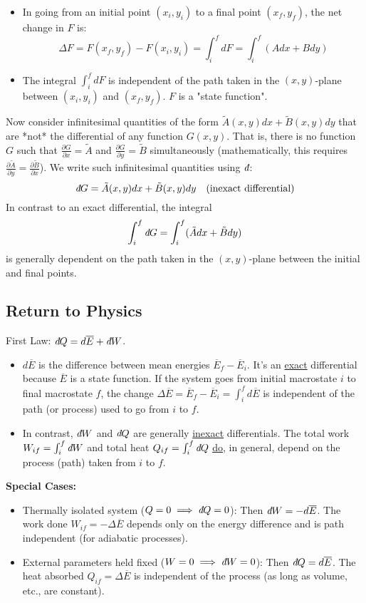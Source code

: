 \documentclass[11pt]{article}
\newcommand{\avg}[1]{\overline{#1}}
\newcommand{\pderiv}[2]{\frac{\partial #1}{\partial #2}}
\newcommand{\ethbar}{\text{\it{đ}}} %
\begin{document}
\begin{itemize}
    \item In going from an initial point $(x_i, y_i)$ to a final point $(x_f, y_f)$, the net change in $F$ is:
    \[ \Delta F = F(x_f, y_f) - F(x_i, y_i) = \int_i^f dF = \int_i^f (A dx + B dy) \]
    \item The integral $\int_i^f dF$ is independent of the path taken in the $(x,y)$-plane between $(x_i, y_i)$ and $(x_f, y_f)$. $F$ is a "state function".
\end{itemize}

Now consider infinitesimal quantities of the form $\tilde{A}(x,y)dx + \tilde{B}(x,y)dy$ that are *not* the differential of any function $G(x,y)$. That is, there is no function $G$ such that $\pderiv{G}{x} = \tilde{A}$ and $\pderiv{G}{y} = \tilde{B}$ simultaneously (mathematically, this requires $\pderiv{\tilde{A}}{y} = \pderiv{\tilde{B}}{x}$).
We write such infinitesimal quantities using $\ethbar$:
\[ \ethbar G = \tilde{A}(x,y)dx + \tilde{B}(x,y)dy \quad (\text{inexact differential}) \]
In contrast to an exact differential, the integral
\[ \int_i^f \ethbar G = \int_i^f (\tilde{A}dx + \tilde{B}dy) \]
is generally dependent on the path taken in the $(x,y)$-plane between the initial and final points.

\subsection*{Return to Physics}

First Law: $\ethbar Q = d\avg{E} + \ethbar W$.
\begin{itemize}
    \item $d\avg{E}$ is the difference between mean energies $\avg{E}_f - \avg{E}_i$. It's an \underline{exact} differential because $\avg{E}$ is a state function. If the system goes from initial macrostate $i$ to final macrostate $f$, the change $\Delta \avg{E} = \avg{E}_f - \avg{E}_i = \int_i^f d\avg{E}$ is independent of the path (or process) used to go from $i$ to $f$.
    \item In contrast, $\ethbar W$ and $\ethbar Q$ are generally \underline{inexact} differentials. The total work $W_{if} = \int_i^f \ethbar W$ and total heat $Q_{if} = \int_i^f \ethbar Q$ \underline{do}, in general, depend on the process (path) taken from $i$ to $f$.
\end{itemize}

\textbf{Special Cases:}
\begin{itemize}
    \item Thermally isolated system ($Q=0 \implies \ethbar Q = 0$):
    Then $\ethbar W = -d\avg{E}$. The work done $W_{if} = -\Delta \avg{E}$ depends only on the energy difference and is path independent (for adiabatic processes).
    \item External parameters held fixed ($W=0 \implies \ethbar W = 0$):
    Then $\ethbar Q = d\avg{E}$. The heat absorbed $Q_{if} = \Delta \avg{E}$ is independent of the process (as long as volume, etc., are constant).
\end{itemize}
\end{document}
